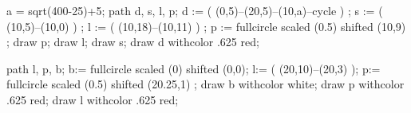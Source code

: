 %
\def\stackrelo#1#2{\mathrel{\mathop{#1}\limits^{\small #2}}}
\def\stackrelu#1#2{\mathrel{\mathop{#1}\limits^{\small #2}}}

%
\def\abs#1{\left| #1 \right|}
\def\norm#1{\left|\left| #1 \right|\right|}
\def\ord{{\rm ord}}
\def\Log{{\rm Log}}
\def\ZZ{$Z\mkern-16mu_{\textstyle Z}\mkern5mu$}
\def\Res{{\rm Res}}
\def\div{{\rm div}}
\def\dim{{\rm dim}}
\def\core{{\rm kern}}
\def\bild{{\rm bild}}
\def\grad{{\rm grad}}

%
\def\lightning{\symbol[wasy general][lightning]}
\def\iddots{\mirror{\ddots}}
%


%
\def\warning{\inmargin{\reuseMPgraphic{achtung}}\underbar{Vorsicht:}}
a = sqrt(400-25)+5;
path d, s, l, p;
d := ( (0,5)--(20,5)--(10,a)--cycle )  ;
s := ( (10,5)--(10,0) ) ;
l := ( (10,18)--(10,11) ) ;
p := fullcircle scaled (0.5) shifted (10,9) ; 
draw p;
draw l;
draw s;
draw d withcolor .625 red;
\stopreusableMPgraphic

\def\notice{\inmargin{\reuseMPgraphic{hinweis}}\underbar{Hinweis: }}
path l, p, b;
b:= fullcircle scaled (0) shifted (0,0);
l:= ( (20,10)--(20,3) );
p:= fullcircle scaled (0.5) shifted (20.25,1) ;
draw b withcolor white;
draw p withcolor .625 red;
draw l withcolor .625 red;
\stopreusableMPgraphic

%
\definecolor[bordeauxred][c=.34, m=.92, y=.64, k=.34]
\definecolor[darkblue][c=1,m=.99,y=0,k=.32]
\definecolor[TEone][c=0,m=.75,y=.51,k=.7]
\definecolor[TEtwo][c=0,m=.19,y=.96,k=.81]
\definecolor[TEthree][c=0,m=0,y=0,k=.77]
\definecolor[TEfive][c=.53,m=.97,y=0,k=.62]

%

